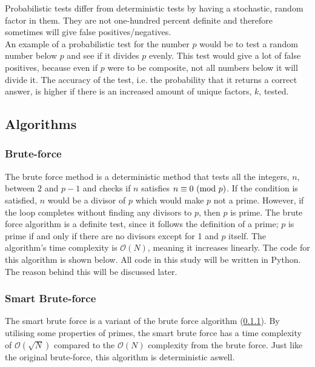 \documentclass[main.tex]{subfiles}
\begin{document}
Probabilistic tests differ from deterministic tests by having a stochastic,
random factor in them. They are not one-hundred percent definite and therefore
sometimes will give false positives/negatives. \\

An example of a probabilistic test for the number $p$ would be to test a random
number below $p$ and see if it divides $p$ evenly. This test would give a lot of
false positives, because even if $p$ were to be composite, not all numbers below
it will divide it. The accuracy of the test, i.e. the probability that it
returns a correct answer, is higher if there is an increased amount of unique
factors, $k$, tested.

\subsection{Algorithms}

\subsubsection{Brute-force} \label{brute} The brute force method is a
deterministic method that tests all the
integers, $n$, between $2$ and $p-1$ and checks if $n$ satisfies $n \equiv 0
\ (\mathrm{mod}\ p)$. If the condition is satisfied, $n$ would be a divisor of $p$ which
would make $p$ not a prime. However, if the loop completes without finding any
divisors to $p$, then $p$ is prime. The brute force algorithm is a definite
test, since it follows the definition of a prime; $p$ is prime if and only if
there are no divisors except for 1 and $p$ itself. The algorithm's time
complexity is $\mathcal{O}(N)$, meaning it increases linearly. The code for this
algorithm is shown below. All code in this study will be written in Python. The
reason behind this will be discussed later.\newline



\subsubsection{Smart Brute-force}
The smart brute force is a variant of the brute force algorithm (\ref{brute}).
By utilising some properties of primes, the smart brute force has a time
complexity of $\mathcal{O}(\sqrt{N})$ compared to the $\mathcal{O}(N)$
complexity from the brute force. Just like the original brute-force, this
algorithm is deterministic aswell.\\
\end{document}
